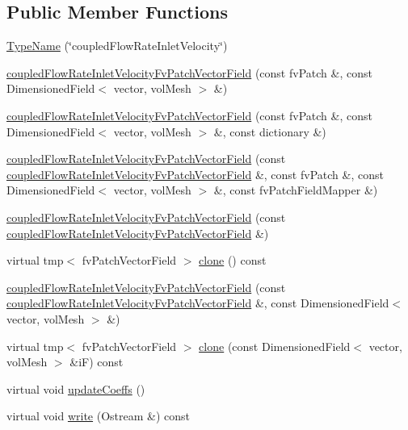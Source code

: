 \subsection*{Public Member Functions}
\begin{DoxyCompactItemize}
\item 
\hyperlink{classFoam_1_1coupledFlowRateInletVelocityFvPatchVectorField_a0a10618d3573e8b6b06acc3a099eb164}{Type\+Name} (\char`\"{}coupled\+Flow\+Rate\+Inlet\+Velocity\char`\"{})
\item 
\hyperlink{classFoam_1_1coupledFlowRateInletVelocityFvPatchVectorField_ae373ecfc30e6fc96df4da19c68d40d93}{coupled\+Flow\+Rate\+Inlet\+Velocity\+Fv\+Patch\+Vector\+Field} (const fv\+Patch \&, const Dimensioned\+Field$<$ vector, vol\+Mesh $>$ \&)
\item 
\hyperlink{classFoam_1_1coupledFlowRateInletVelocityFvPatchVectorField_a39c41d296c0dd93edc0587e8dc71de95}{coupled\+Flow\+Rate\+Inlet\+Velocity\+Fv\+Patch\+Vector\+Field} (const fv\+Patch \&, const Dimensioned\+Field$<$ vector, vol\+Mesh $>$ \&, const dictionary \&)
\item 
\hyperlink{classFoam_1_1coupledFlowRateInletVelocityFvPatchVectorField_a2aa0b1d77acc1126b49c09840b67703f}{coupled\+Flow\+Rate\+Inlet\+Velocity\+Fv\+Patch\+Vector\+Field} (const \hyperlink{classFoam_1_1coupledFlowRateInletVelocityFvPatchVectorField}{coupled\+Flow\+Rate\+Inlet\+Velocity\+Fv\+Patch\+Vector\+Field} \&, const fv\+Patch \&, const Dimensioned\+Field$<$ vector, vol\+Mesh $>$ \&, const fv\+Patch\+Field\+Mapper \&)
\item 
\hyperlink{classFoam_1_1coupledFlowRateInletVelocityFvPatchVectorField_a115f68a6b41ea4cbe9c7651925980df5}{coupled\+Flow\+Rate\+Inlet\+Velocity\+Fv\+Patch\+Vector\+Field} (const \hyperlink{classFoam_1_1coupledFlowRateInletVelocityFvPatchVectorField}{coupled\+Flow\+Rate\+Inlet\+Velocity\+Fv\+Patch\+Vector\+Field} \&)
\item 
virtual tmp$<$ fv\+Patch\+Vector\+Field $>$ \hyperlink{classFoam_1_1coupledFlowRateInletVelocityFvPatchVectorField_af0f4bc68c73acc08f11adb3a8957d875}{clone} () const
\item 
\hyperlink{classFoam_1_1coupledFlowRateInletVelocityFvPatchVectorField_afc35dd162c382726bcbfcfd1386775d8}{coupled\+Flow\+Rate\+Inlet\+Velocity\+Fv\+Patch\+Vector\+Field} (const \hyperlink{classFoam_1_1coupledFlowRateInletVelocityFvPatchVectorField}{coupled\+Flow\+Rate\+Inlet\+Velocity\+Fv\+Patch\+Vector\+Field} \&, const Dimensioned\+Field$<$ vector, vol\+Mesh $>$ \&)
\item 
virtual tmp$<$ fv\+Patch\+Vector\+Field $>$ \hyperlink{classFoam_1_1coupledFlowRateInletVelocityFvPatchVectorField_a089f8c8dc7161cb741c2b911efc67d76}{clone} (const Dimensioned\+Field$<$ vector, vol\+Mesh $>$ \&iF) const
\item 
virtual void \hyperlink{classFoam_1_1coupledFlowRateInletVelocityFvPatchVectorField_a7e24eafac629d3733181cd942d4c902f}{update\+Coeffs} ()
\item 
virtual void \hyperlink{classFoam_1_1coupledFlowRateInletVelocityFvPatchVectorField_a293fdfec8bdfbd5c3913ab4c9f3454ff}{write} (Ostream \&) const
\end{DoxyCompactItemize}


